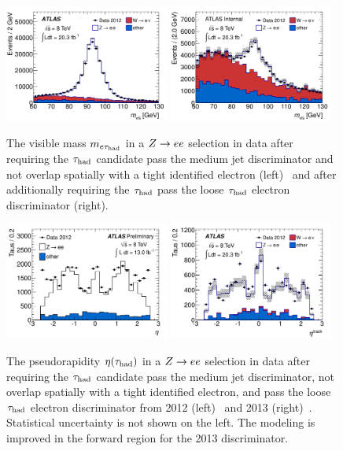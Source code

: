 \begin{figure}[tp]
  \centering
  \includegraphics[width=0.48\textwidth]{figures/PERF-2013-06/fig_14a}
  \includegraphics[width=0.48\textwidth]{figures/PERF-2013-06/eveto_mvis_mediumID_loosePPOLR_looseeveto}
  \caption{The visible mass $m_{e\tau_\text{had}}$ in a $Z \rightarrow ee$ selection in data after requiring the $\tau_\text{had}$ candidate pass the medium jet discriminator and not overlap spatially with a tight identified electron (left)~\cite{PERF-2013-06} and after additionally requiring the $\tau_\text{had}$ pass the loose $\tau_\text{had}$ electron discriminator (right).}
  \label{fig:taus-electronfakes2}
\end{figure}

\begin{figure}[tp]
  \centering
  \includegraphics[width=0.48\textwidth]{figures/ATLAS-CONF-2013-064/fig_22b}
  \includegraphics[width=0.48\textwidth]{figures/PERF-2013-06/fig_14b}
  \caption{The pseudorapidity $\eta(\tauh)$ in a $Z \rightarrow ee$ selection in data after requiring the $\tau_\text{had}$ candidate pass the medium jet discriminator, not overlap spatially with a tight identified electron, and pass the loose $\tau_\text{had}$ electron discriminator from 2012 (left)~\cite{ATLAS-CONF-2013-064} and 2013 (right)~\cite{PERF-2013-06}. Statistical uncertainty is not shown on the left. The modeling is improved in the forward region for the 2013 discriminator.}
  \label{fig:taus-electronfakes3}
\end{figure}

